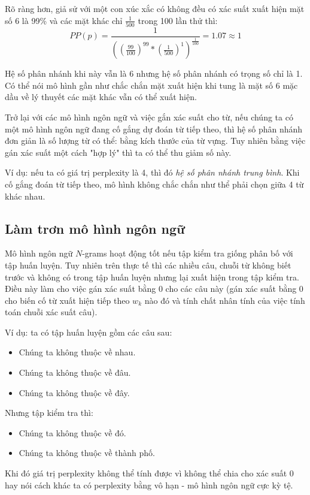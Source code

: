  Rõ ràng hơn, giả sử với một con xúc xắc có không đều có xác suất xuất hiện mặt số 6 là 99\% và các mặt khác chỉ $\frac{1}{500}$ trong 100 lần thử thì:
  $$PP(p)=\frac{1}{((\frac{99}{100})^{99}*(\frac{1}{500})^{1})^{\frac{1}{100}}}=1.07\approx 1$$

  Hệ số phân nhánh khi này vẫn là 6 nhưng hệ số phân nhánh có trọng số chỉ là 1. Có thể nói mô hình gần như chắc chắn mặt xuất hiện khi tung là mặt số 6 mặc dầu về lý thuyết các mặt khác vẫn có thể xuất hiện.

  Trở lại với các mô hình ngôn ngữ và việc gắn xác suất cho từ, nếu chúng ta có một mô hình ngôn ngữ đang cố gắng dự đoán từ tiếp theo, thì hệ số phân nhánh đơn giản là số lượng từ có thể: bằng kích thước của từ vựng. Tuy nhiên bằng việc gán xác suất một cách "hợp lý" thì ta có thể thu giảm số này.

  Ví dụ: nếu ta có giá trị perplexity là 4, thì đó \textit{hệ số phân nhánh trung bình}. Khi cố gắng đoán từ tiếp theo, mô hình không chắc chắn như thể phải chọn giữa 4 từ khác nhau.

  \subsection{Làm trơn mô hình ngôn ngữ}
  Mô hình ngôn ngữ $N$-grams hoạt động tốt nếu tập kiểm tra giống phân bố với tập huấn luyện. Tuy nhiên trên thực tế thì các nhiều câu, chuỗi từ không biết trước và không có trong tập huấn luyện nhưng lại xuất hiện trong tập kiểm tra. Điều này làm cho việc gán xác suất bằng $0$ cho các câu này (gán xác suất bằng $0$ cho biến cố từ xuất hiện tiếp theo $w_k$ nào đó và tính chất nhân tính của việc tính toán chuỗi xác suất câu).

  Ví dụ: ta có tập huấn luyện gồm các câu sau:
  \begin{itemize}
      \item Chúng ta không thuộc về nhau.
      \item Chúng ta không thuộc về đâu.
      \item Chúng ta không thuộc về đây.
  \end{itemize}

  Nhưng tập kiểm tra thì:
  \begin{itemize}
  \item Chúng ta không thuộc về đó.
  \item Chúng ta không thuộc về thành phố.
  \end{itemize}

  Khi đó giá trị perplexity không thể tính được vì không thể chia cho xác suất $0$ hay nói cách khác ta có perplexity bằng vô hạn - mô hình ngôn ngữ cực kỳ tệ.

